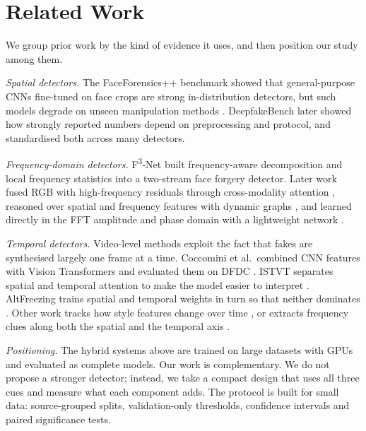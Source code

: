 \documentclass[conference]{IEEEtran}
\begin{document}
\section{Related Work}
\label{sec:related}

We group prior work by the kind of evidence it uses, and then position our
study among them.

\textit{Spatial detectors.} The FaceForensics++ benchmark
\cite{rossler2019faceforensics} showed that general-purpose CNNs fine-tuned on
face crops are strong in-distribution detectors, but such models degrade on
unseen manipulation methods \cite{tolosana2020survey}. DeepfakeBench
\cite{yan2023deepfakebench} later showed how strongly reported numbers depend
on preprocessing and protocol, and standardised both across many detectors.

\textit{Frequency-domain detectors.} F\textsuperscript{3}-Net
\cite{qian2020thinking} built frequency-aware decomposition and local
frequency statistics into a two-stream face forgery detector. Later work fused
RGB with high-frequency residuals through cross-modality attention
\cite{luo2021highfreq}, reasoned over spatial and frequency features with
dynamic graphs \cite{wang2023sfdg}, and learned directly in the FFT amplitude
and phase domain with a lightweight network \cite{tan2024freqnet}.

\textit{Temporal detectors.} Video-level methods exploit the fact that fakes
are synthesised largely one frame at a time. Coccomini et al.\ combined CNN
features with Vision Transformers and evaluated them on DFDC
\cite{coccomini2022effvit}. ISTVT separates spatial and temporal attention to
make the model easier to interpret \cite{zhao2023istvt}. AltFreezing trains
spatial and temporal weights in turn so that neither dominates
\cite{wang2023altfreezing}. Other work tracks how style features change over
time \cite{choi2024stylelatent}, or extracts frequency clues along both the
spatial and the temporal axis \cite{wang2023stfclue}.

\textit{Positioning.} The hybrid systems above are trained on large datasets
with GPUs and evaluated as complete models. Our work is complementary. We do
not propose a stronger detector; instead, we take a compact design that uses
all three cues and measure what each component adds. The protocol is built
for small data: source-grouped splits, validation-only thresholds, confidence
intervals and paired significance tests.
\end{document}
